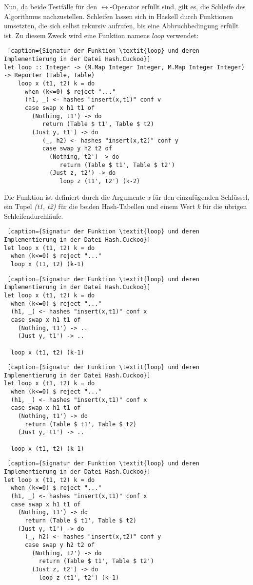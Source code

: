 Nun, da beide Testfälle für den \(\leftrightarrow\)-Operator erfüllt sind, gilt es, die Schleife des Algorithmus nachzustellen. Schleifen lassen sich in Haskell durch Funktionen umsetzten, die sich selbst rekursiv aufrufen, bis eine Abbruchbedingung erfüllt ist. 
\newpage
Zu diesem Zweck wird eine Funktion namens \(loop\) verwendet:
\begin{lstlisting} [caption={Signatur der Funktion \textit{loop} und deren Implementierung in der Datei Hash.Cuckoo}]
let loop :: Integer -> (M.Map Integer Integer, M.Map Integer Integer) -> Reporter (Table, Table)
    loop x (t1, t2) k = do
      when (k<=0) $ reject "..."
      (h1, _) <- hashes "insert(x,t1)" conf v
      case swap x h1 t1 of
        (Nothing, t1') -> do
           return (Table $ t1', Table $ t2)
        (Just y, t1') -> do
           (_, h2) <- hashes "insert(x,t2)" conf y
           case swap y h2 t2 of
             (Nothing, t2') -> do
                return (Table $ t1', Table $ t2')
             (Just z, t2') -> do
                loop z (t1', t2') (k-2)
\end{lstlisting}
Die Funktion ist definiert durch die Argumente \textit{x} für den einzufügenden Schlüssel, ein Tupel \textit{(t1, t2)} für die beiden Hash-Tabellen und einem Wert \textit{k} für die übrigen Schleifendurchläufe. 
\begin{lstlisting} [caption={Signatur der Funktion \textit{loop} und deren Implementierung in der Datei Hash.Cuckoo}]
let loop x (t1, t2) k = do
  when (k<=0) $ reject "..."
  loop x (t1, t2) (k-1)
\end{lstlisting}
\newpage
\begin{lstlisting} [caption={Signatur der Funktion \textit{loop} und deren Implementierung in der Datei Hash.Cuckoo}]
let loop x (t1, t2) k = do
  when (k<=0) $ reject "..."
  (h1, _) <- hashes "insert(x,t1)" conf x
  case swap x h1 t1 of
    (Nothing, t1') -> ..
    (Just y, t1') -> ..
    
  loop x (t1, t2) (k-1)
\end{lstlisting}
\begin{lstlisting} [caption={Signatur der Funktion \textit{loop} und deren Implementierung in der Datei Hash.Cuckoo}]
let loop x (t1, t2) k = do
  when (k<=0) $ reject "..."
  (h1, _) <- hashes "insert(x,t1)" conf x
  case swap x h1 t1 of
    (Nothing, t1') -> do
      return (Table $ t1', Table $ t2)
    (Just y, t1') -> ..

  loop x (t1, t2) (k-1)
\end{lstlisting}
\begin{lstlisting} [caption={Signatur der Funktion \textit{loop} und deren Implementierung in der Datei Hash.Cuckoo}]
let loop x (t1, t2) k = do
  when (k<=0) $ reject "..."
  (h1, _) <- hashes "insert(x,t1)" conf x
  case swap x h1 t1 of
    (Nothing, t1') -> do
      return (Table $ t1', Table $ t2)
    (Just y, t1') -> do
      (_, h2) <- hashes "insert(x,t2)" conf y
      case swap y h2 t2 of
        (Nothing, t2') -> do
          return (Table $ t1', Table $ t2')
        (Just z, t2') -> do
          loop z (t1', t2') (k-1)
\end{lstlisting}
